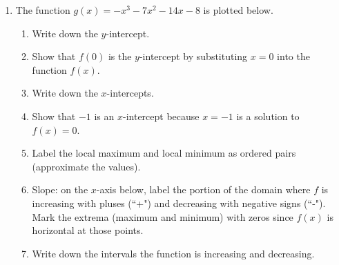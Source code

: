 \documentclass[12pt, twoside]{article}
\begin{document}
\begin{enumerate}
\newpage
\item The function $g(x)=-x^3-7x^2-14x-8$ is plotted below.\\

    \begin{enumerate}
    \item Write down the $y$-intercept.
    \item Show that $f(0)$ is the $y$-intercept by substituting $x=0$ into the function $f(x)$.\vspace{1cm}
    \item Write down the $x$-intercepts.
    \item Show that $-1$ is an $x$-intercept because $x=-1$ is a solution to $f(x)=0$.\vspace{1cm}
    \item Label the local maximum and local minimum as ordered pairs (approximate the values).
    \item Slope: on the $x$-axis below, label the portion of the domain where $f$ is increasing with pluses (``+") and decreasing with negative signs (``-"). Mark the extrema (maximum and minimum) with zeros since $f(x)$ is horizontal at those points.
    \item Write down the intervals the function is increasing and decreasing.
    \end{enumerate}\vspace{1cm}


\end{enumerate}
\end{document}
